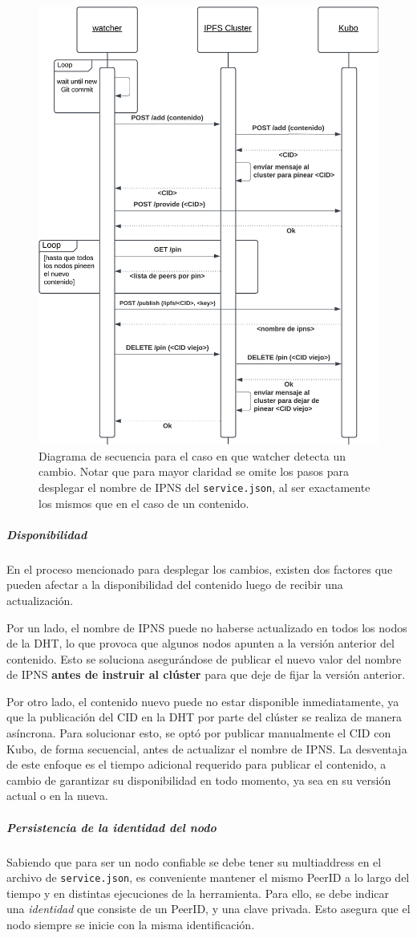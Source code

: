 \begin{figure}[h!]
    \centering
    \includegraphics[width=0.5\linewidth]{img/solucion-ipfs/ds-trusted-peer.png}
    \caption{Diagrama de secuencia para el caso en que watcher detecta un cambio. Notar que para mayor claridad se omite los pasos para desplegar el nombre de IPNS del \texttt{service.json}, al ser exactamente los mismos que en el caso de un contenido.}
    \label{fig:contenedores-trusted-peer}
\end{figure}

\subparagraph{Disponibilidad} En el proceso mencionado para desplegar los cambios, existen dos factores que pueden afectar a la disponibilidad del contenido luego de recibir una actualización.

Por un lado, el nombre de IPNS puede no haberse actualizado en todos los nodos de la DHT, lo que provoca que algunos nodos apunten a la versión anterior del contenido. Esto se soluciona asegurándose de publicar el nuevo valor del nombre de IPNS \textbf{antes de instruir al clúster} para que deje de fijar la versión anterior.

Por otro lado, el contenido nuevo puede no estar disponible inmediatamente, ya que la publicación del CID en la DHT por parte del clúster se realiza de manera asíncrona. Para solucionar esto, se optó por publicar manualmente el CID con Kubo, de forma secuencial, antes de actualizar el nombre de IPNS. La desventaja de este enfoque es el tiempo adicional requerido para publicar el contenido, a cambio de garantizar su disponibilidad en todo momento, ya sea en su versión actual o en la nueva.

\subparagraph{Persistencia de la identidad del nodo}

Sabiendo que para ser un nodo confiable se debe tener su multiaddress en el archivo de \texttt{service.json}, es conveniente mantener el mismo PeerID a lo largo del tiempo y en distintas ejecuciones de la herramienta. Para ello, se debe indicar una \textit{identidad} que consiste de un PeerID, y una clave privada. Esto asegura que el nodo siempre se inicie con la misma identificación.

